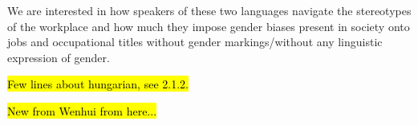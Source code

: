 \documentclass[11pt]{article}
\begin{document}
We are interested in how speakers of these two languages navigate the stereotypes of the workplace and how much they impose gender biases present in society onto jobs and occupational titles without gender markings/without any linguistic expression of gender.

\hl{Few lines about hungarian, see 2.1.2.}




\hl{New from Wenhui from here...}
\end{document}
